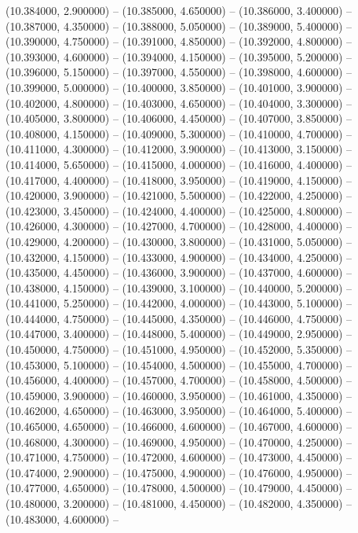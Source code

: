 (10.384000, 2.900000) -- 
(10.385000, 4.650000) -- 
(10.386000, 3.400000) -- 
(10.387000, 4.350000) -- 
(10.388000, 5.050000) -- 
(10.389000, 5.400000) -- 
(10.390000, 4.750000) -- 
(10.391000, 4.850000) -- 
(10.392000, 4.800000) -- 
(10.393000, 4.600000) -- 
(10.394000, 4.150000) -- 
(10.395000, 5.200000) -- 
(10.396000, 5.150000) -- 
(10.397000, 4.550000) -- 
(10.398000, 4.600000) -- 
(10.399000, 5.000000) -- 
(10.400000, 3.850000) -- 
(10.401000, 3.900000) -- 
(10.402000, 4.800000) -- 
(10.403000, 4.650000) -- 
(10.404000, 3.300000) -- 
(10.405000, 3.800000) -- 
(10.406000, 4.450000) -- 
(10.407000, 3.850000) -- 
(10.408000, 4.150000) -- 
(10.409000, 5.300000) -- 
(10.410000, 4.700000) -- 
(10.411000, 4.300000) -- 
(10.412000, 3.900000) -- 
(10.413000, 3.150000) -- 
(10.414000, 5.650000) -- 
(10.415000, 4.000000) -- 
(10.416000, 4.400000) -- 
(10.417000, 4.400000) -- 
(10.418000, 3.950000) -- 
(10.419000, 4.150000) -- 
(10.420000, 3.900000) -- 
(10.421000, 5.500000) -- 
(10.422000, 4.250000) -- 
(10.423000, 3.450000) -- 
(10.424000, 4.400000) -- 
(10.425000, 4.800000) -- 
(10.426000, 4.300000) -- 
(10.427000, 4.700000) -- 
(10.428000, 4.400000) -- 
(10.429000, 4.200000) -- 
(10.430000, 3.800000) -- 
(10.431000, 5.050000) -- 
(10.432000, 4.150000) -- 
(10.433000, 4.900000) -- 
(10.434000, 4.250000) -- 
(10.435000, 4.450000) -- 
(10.436000, 3.900000) -- 
(10.437000, 4.600000) -- 
(10.438000, 4.150000) -- 
(10.439000, 3.100000) -- 
(10.440000, 5.200000) -- 
(10.441000, 5.250000) -- 
(10.442000, 4.000000) -- 
(10.443000, 5.100000) -- 
(10.444000, 4.750000) -- 
(10.445000, 4.350000) -- 
(10.446000, 4.750000) -- 
(10.447000, 3.400000) -- 
(10.448000, 5.400000) -- 
(10.449000, 2.950000) -- 
(10.450000, 4.750000) -- 
(10.451000, 4.950000) -- 
(10.452000, 5.350000) -- 
(10.453000, 5.100000) -- 
(10.454000, 4.500000) -- 
(10.455000, 4.700000) -- 
(10.456000, 4.400000) -- 
(10.457000, 4.700000) -- 
(10.458000, 4.500000) -- 
(10.459000, 3.900000) -- 
(10.460000, 3.950000) -- 
(10.461000, 4.350000) -- 
(10.462000, 4.650000) -- 
(10.463000, 3.950000) -- 
(10.464000, 5.400000) -- 
(10.465000, 4.650000) -- 
(10.466000, 4.600000) -- 
(10.467000, 4.600000) -- 
(10.468000, 4.300000) -- 
(10.469000, 4.950000) -- 
(10.470000, 4.250000) -- 
(10.471000, 4.750000) -- 
(10.472000, 4.600000) -- 
(10.473000, 4.450000) -- 
(10.474000, 2.900000) -- 
(10.475000, 4.900000) -- 
(10.476000, 4.950000) -- 
(10.477000, 4.650000) -- 
(10.478000, 4.500000) -- 
(10.479000, 4.450000) -- 
(10.480000, 3.200000) -- 
(10.481000, 4.450000) -- 
(10.482000, 4.350000) -- 
(10.483000, 4.600000) -- 
